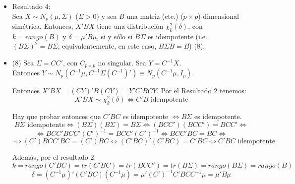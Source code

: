 \documentclass[11pt,a4paper]{article}
\begin{document}
\begin{itemize}
\item Resultado 4: \\
Sea $X \sim N_{p}(\mu, \Sigma)$ ($\Sigma > 0$) y sea $B$ una matriz (cte.) ($p \times p$)-dimensional simétrica. Entonces, $X'BX$ tiene una distribución $\chi_{k}^{2}(\delta)$, con $k = rango(B)$ y $\delta = \mu'B\mu$, si y sólo si $B\Sigma$ es idempotente (i.e. $(B\Sigma)^{2} = B\Sigma$; equivalentemente, en este caso, $B\Sigma B = B$) \hspace{1cm} (8).

\item (8) Sea $\Sigma = CC'$, con $C_{p \times p}$ no singular. Sea $Y = C^{-1}X$. \\
Entonces $Y \sim N_{p}(C^{-1}\mu, C^{-1}\Sigma(C^{-1})') \equiv N_{p}(C^{-1}\mu, I_{p})$.

Entonces $X'BX = (CY)'B(CY) = Y'C'BCY$. Por el Resultado 2 tenemos:
$$X'BX \sim \chi_{k}^{2}(\delta) \iff C'B \text{ idempotente}$$

Hay que probar entonces que $C'BC$ es idempotente $\iff B\Sigma$ es idempotente.
$$B\Sigma \text{ idempotente} \iff (B\Sigma)(B\Sigma) = B\Sigma \iff (BCC')(BCC') = BCC' \iff$$
$$\iff BCC'BCC'(C')^{-1} = BCC'(C')^{-1} \iff BCC'BC = BC \iff$$
$$\iff (C')BCC'BC = (C')BC \iff (C'BC)'(C'BC) = C'BC \iff C'BC \text{ idempotente}$$

Además, por el resultado 2: 
$$k = rango (C'BC) = tr(C'BC) = tr(BCC') = tr(B\Sigma) = rango(B\Sigma) = rango(B)$$
$$\delta = (C^{-1}\mu)'(C'BC)(C^{-1}\mu) = \mu'(C')^{-1}C'BCC^{-1}\mu = \mu'B\mu$$
\end{itemize}
\end{document}
